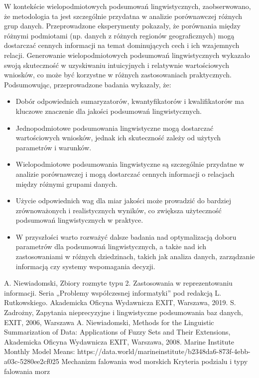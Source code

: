 \documentclass{article}
\begin{document}
\noindent W kontekście wielopodmiotowych podsumowań lingwistycznych, zaobserwowano, że metodologia ta jest szczególnie przydatna w analizie porównawczej różnych grup danych. Przeprowadzone eksperymenty pokazały, że porównania między różnymi podmiotami (np. danych z różnych regionów geograficznych) mogą dostarczać cennych informacji na temat dominujących cech i ich wzajemnych relacji. Generowanie wielopodmiotowych podsumowań lingwistycznych wykazało swoją skuteczność w uzyskiwaniu intuicyjnych i relatywnie wartościowych wniosków, co może być korzystne w różnych zastosowaniach praktycznych. \\

Podsumowując, przeprowadzone badania wykazały, że:
\begin{itemize}
    \item Dobór odpowiednich sumaryzatorów, kwantyfikatorów i kwalifikatorów ma kluczowe znaczenie dla jakości podsumowań lingwistycznych.
    \item Jednopodmiotowe podsumowania lingwistyczne mogą dostarczać wartościowych wniosków, jednak ich skuteczność zależy od użytych parametrów i warunków.
    \item Wielopodmiotowe podsumowania lingwistyczne są szczególnie przydatne w analizie porównawczej i mogą dostarczać cennych informacji o relacjach między różnymi grupami danych.
    \item Użycie odpowiednich wag dla miar jakości może prowadzić do bardziej zrównoważonych i realistycznych wyników, co zwiększa użyteczność podsumowań lingwistycznych w praktyce.
    \item W przyszłości warto rozważyć dalsze badania nad optymalizacją doboru parametrów dla podsumowań lingwistycznych, a także nad ich zastosowaniami w różnych dziedzinach, takich jak analiza danych, zarządzanie informacją czy systemy wspomagania decyzji.
\end{itemize}




\begin{thebibliography}{99}
  A. Niewiadomski, Zbiory rozmyte typu 2. Zastosowania w reprezentowaniu informacji.  Seria „Problemy współczesnej informatyki” pod redakcją L. Rutkowskiego. Akademicka Oficyna Wydawnicza EXIT, Warszawa, 2019.
 S. Zadrożny, Zapytania nieprecyzyjne i lingwistyczne podsumowania baz danych, EXIT, 2006, Warszawa
 A. Niewiadomski, Methods for the Linguistic Summarization of Data: Applications of Fuzzy Sets and Their Extensions, Akademicka Oficyna Wydawnicza EXIT, Warszawa, 2008.
 Marine Institute Monthly Model Means: https://data.world/marineinstitute/b2348da6-873f-4ebb-a03c-5280ee2cf025
 Mechanizm falowania wod morskich Kryteria podzialu i typy falowania morz
\end{thebibliography}
\end{document}
